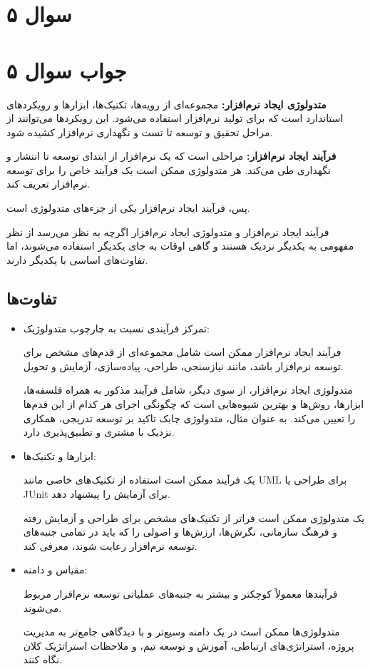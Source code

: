 \section*{سوال ۵}



\section*{جواب سوال ۵}

\textbf{متدولوژی ایجاد نرم‌افزار:} مجموعه‌ای از رویه‌ها، تکنیک‌ها، ابزارها و رویکردهای استاندارد است که برای تولید نرم‌افزار استفاده می‌شود. این رویکردها می‌توانند از مراحل تحقیق و توسعه تا تست و نگهداری نرم‌افزار کشیده شود.

\textbf{فرآیند ایجاد نرم‌افزار:} مراحلی است که یک نرم‌افزار از ابتدای توسعه تا انتشار و نگهداری طی می‌کند. هر متدولوژی ممکن است یک فرآیند خاص را برای توسعه نرم‌افزار تعریف کند.

پس، فرآیند ایجاد نرم‌افزار یکی از جزء‌های متدولوژی است.

فرآیند ایجاد نرم‌افزار و متدولوژی ایجاد نرم‌افزار اگرچه به نظر می‌رسد از نظر مفهومی به یکدیگر نزدیک هستند و گاهی اوقات به جای یکدیگر استفاده می‌شوند، اما تفاوت‌های اساسی با یکدیگر دارند.

\subsection*{تفاوت‌ها}

\begin{itemize}
	\item تمرکز فرآیندی نسبت به چارچوب متدولوژیک:
	
	فرآیند ایجاد نرم‌افزار ممکن است شامل مجموعه‌ای از قدم‌های مشخص برای توسعه نرم‌افزار باشد، مانند نیازسنجی، طراحی، پیاده‌سازی، آزمایش و تحویل.
	
	متدولوژی ایجاد نرم‌افزار، از سوی دیگر، شامل فرآیند مذکور به همراه فلسفه‌ها، ابزارها، روش‌ها و بهترین شیوه‌هایی است که چگونگی اجرای هر کدام از این قدم‌ها را تعیین می‌کند. به عنوان مثال، متدولوژی چابک تاکید بر توسعه تدریجی، همکاری نزدیک با مشتری و تطبیق‌پذیری دارد.
	
	\item ابزارها و تکنیک‌ها:
	
	یک فرآیند ممکن است استفاده از تکنیک‌های خاصی مانند UML برای طراحی یا JUnit برای آزمایش را پیشنهاد دهد.
	
	یک متدولوژی ممکن است فراتر از تکنیک‌های مشخص برای طراحی و آزمایش رفته و فرهنگ سازمانی، نگرش‌ها، ارزش‌ها و اصولی را که باید در تمامی جنبه‌های توسعه نرم‌افزار رعایت شوند، معرفی کند.
	
	\item مقیاس و دامنه:
	
	فرآیندها معمولاً کوچکتر و بیشتر به جنبه‌های عملیاتی توسعه نرم‌افزار مربوط می‌شوند.
	
	متدولوژی‌ها ممکن است در یک دامنه وسیع‌تر و با دیدگاهی جامع‌تر به مدیریت پروژه، استراتژی‌های ارتباطی، آموزش و توسعه تیم، و ملاحظات استراتژیک کلان نگاه کنند.
\end{itemize}


